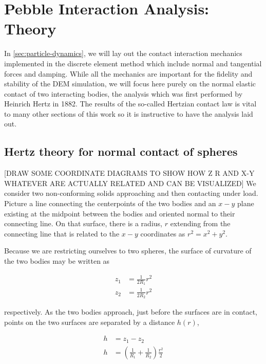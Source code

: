 \chapter{Pebble Interaction Analysis: Theory} \label{sec:hertz-theory}

In \cref{sec:particle-dynamics}, we will lay out the contact interaction mechanics implemented in the discrete element method which include normal and tangential forces and damping. While all the mechanics are important for the fidelity and stability of the DEM simulation, we will focus here purely on the normal elastic contact of two interacting bodies, the analysis which was first performed by Heinrich Hertz in 1882. The results of the so-called Hertzian contact law is vital to many other sections of this work so it is instructive to have the analysis laid out.

\section{Hertz theory for normal contact of spheres}\label{sec:hertz-contact}
[DRAW SOME COORDINATE DIAGRAMS TO SHOW HOW Z R AND X-Y WHATEVER ARE ACTUALLY RELATED AND CAN BE VISUALIZED]
We consider two non-conforming solids approaching and then contacting under load. Picture a line connecting the centerpoints of the two bodies and an $x-y$ plane existing at the midpoint between the bodies and oriented normal to their connecting line. On that surface, there is a radius, $r$ extending from the connecting line that is related to the $x-y$ coordinates as $r^2 = x^2 + y^2$.

Because we are restricting ourselves to two spheres, the surface of curvature of the two bodies may be written as

\begin{subequations}
\begin{align}
z_1 &= \frac{1}{2R_1}r^2 \\
z_2 &= \frac{1}{2R_2}r^2
\end{align}
\end{subequations}

respectively. As the two bodies approach, just before the surfaces are in contact, points on the two surfaces are separated by a distance $h(r)$,

\begin{align}\label{eq:separationh}
h &= z_1 - z_2 \nonumber \\
h & = \left(\frac{1}{R_1} + \frac{1}{R_2}\right)\frac{r^2}{2} 
\end{align}

